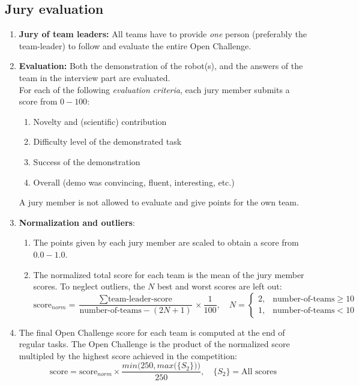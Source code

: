 \OpenDemonstrationChanges

\subsection{Jury evaluation}
\begin{enumerate}
	\item \textbf{Jury of team leaders:} All teams have to provide \emph{one} person
	(preferably the team-leader) to follow and evaluate the entire Open Challenge.
	\item \textbf{Evaluation:} Both the demonstration of the robot(s), and the answers of the team in the interview part are evaluated.\\
	For each of the following \emph{evaluation criteria}, each jury member submits a score from $0-100$:
	\begin{enumerate}
	\item Novelty and (scientific) contribution
	\item Difficulty level of the demonstrated task
	\item Success of the demonstration
	\item Overall (demo was convincing, fluent, interesting, etc.)
	\end{enumerate}
	A jury member is not allowed to evaluate and give points for the own team.
	\item \textbf{Normalization and outliers}:
	\begin{enumerate}
		\item The points given by each jury member are scaled to obtain a score from $0.0-1.0$.
		\item The normalized total score for each team is the mean of the jury member scores.
			To neglect outliers, the $N$ best and worst scores are left out:
			$$\mbox{score}_{norm} = \frac{\sum\mbox{team-leader-score}}{\mbox{number-of-teams} - (2N+1)}\times\frac{1}{100},
			\quad N=\begin{cases}2, & \mbox{number-of-teams} \ge 10\\1, & \mbox{number-of-teams} < 10 \end{cases}$$
		\end{enumerate}
		\item The final Open Challenge score for each team is computed at the end of regular tasks. The Open Challenge  is the product of the normalized score multipled by the highest score achieved in the competition:
		$$\mbox{score} = \mbox{score}_{norm} \times \frac{min\Big(250, max\big(\{S_2\}\big)\Big)}{250},
		\quad \{S_2\}=\mbox{All scores}
		$$
\end{enumerate}

